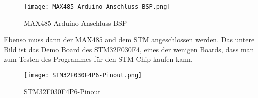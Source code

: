         \begin{figure}[!htb]
            \centering
            \texttt{[image: MAX485-Arduino-Anschluss-BSP.png]}
            \caption{MAX485-Arduino-Anschluss-BSP}
            \label{caption:MAX485-Arduino-Anschluss-BSP}
        \end{figure}

\newpage
        \noindent Ebenso muss dann der MAX485 and dem STM angeschlossen werden. Das untere Bild ist das Demo Board des STM32F030F4, eines der wenigen Boards, dass man zum Testen des Programmes 
        für den STM Chip kaufen kann.
    
        \begin{figure}[!htb]
            \centering
            \texttt{[image: STM32F030F4P6-Pinout.png]}
            \caption{STM32F030F4P6-Pinout}
            \label{caption:STM32F030F4P6-Pinout}
        \end{figure} 
        